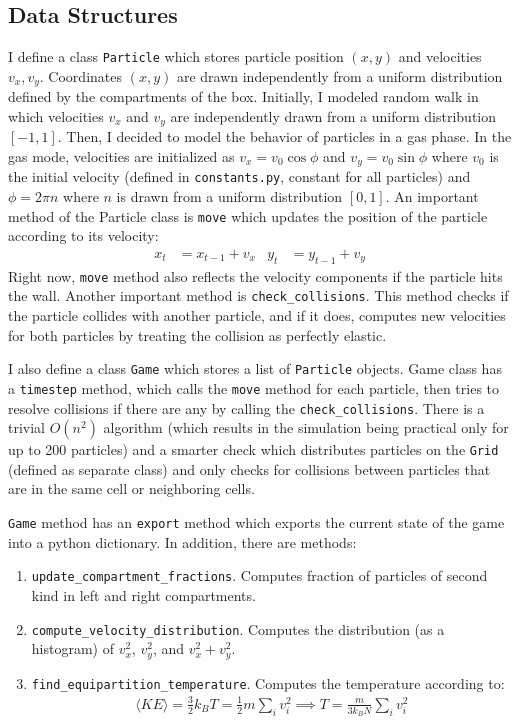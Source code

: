 \documentclass[10pt]{article}
\begin{document}
\subsection{Data Structures}
I define a class \texttt{Particle} which stores particle position $(x,y)$ and velocities $v_x,v_y$. Coordinates $(x,y)$ are drawn independently from a uniform distribution defined by the compartments of the box. Initially, I modeled random walk in which velocities $v_x$ and $v_y$ are independently drawn from a uniform distribution $[-1,1]$. Then, I decided to model the behavior of particles in a gas phase. In the gas mode, velocities are initialized as $v_x=v_0 \cos \phi$ and $v_y=v_0 \sin \phi$ where $v_0$ is the initial velocity (defined in \texttt{constants.py}, constant for all particles) and $\phi=2\pi n$ where $n$ is drawn from a uniform distribution $[0,1]$. An important method of the Particle class is \texttt{move} which updates the position of the particle according to its velocity:
\begin{align}
    x_t &= x_{t-1} + v_x & y_t &= y_{t-1} + v_y
\end{align}
Right now, \texttt{move} method also reflects the velocity components if the particle hits the wall. Another important method is \texttt{check\_collisions}. This method checks if the particle collides with another particle, and if it does, computes new velocities for both particles by treating the collision as perfectly elastic.

I also define a class \texttt{Game} which stores a list of \texttt{Particle} objects. Game class has a \texttt{timestep} method, which calls the \texttt{move} method for each particle, then tries to resolve collisions if there are any by calling the \texttt{check\_collisions}. There is a trivial $O(n^2)$ algorithm (which results in the simulation being practical only for up to 200 particles) and a smarter check which distributes particles on the \texttt{Grid} (defined as separate class) and only checks for collisions between particles that are in the same cell or neighboring cells.

\texttt{Game} method has an \texttt{export} method which exports the current state of the game into a python dictionary. In addition, there are methods:
\begin{enumerate}
    \item \texttt{update\_compartment\_fractions}. Computes fraction of particles of second kind in left and right compartments.
    \item \texttt{compute\_velocity\_distribution}. Computes the distribution (as a histogram) of $v_x^2$, $v_y^2$, and $v_x^2+v_y^2$.
    \item \texttt{find\_equipartition\_temperature}. Computes the temperature according to:
    \begin{align}
        \langle KE \rangle = \frac{3}{2} k_B T = \frac{1}{2} m \sum_i v_i^2 \implies T = \frac{m}{3k_B N} \sum_i v_i^2
    \end{align}
\end{enumerate}
\end{document}
